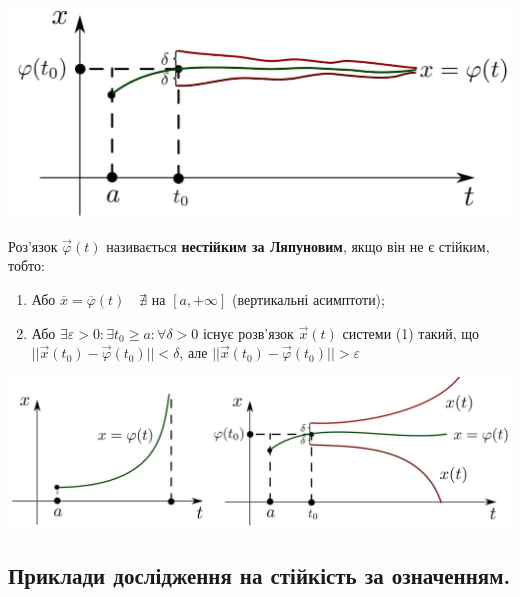 \documentclass[14pt,a4paper]{scrartcl}
\theoremstyle{definition}
\theoremstyle{definition}
\theoremstyle{definition}
\begin{document}
\begin{center} \includegraphics[scale=0.35]{assets/lect2.jpg} \end{center}

Роз'язок $\vec{\varphi}(t)$ називається \textbf{нестійким за Ляпуновим}, якщо він не є стійким, тобто:
\ed

\begin{enumerate}
  \item Або $\overline{x} = \overline{\varphi}(t) \quad \nexists$ на  $[a, +\infty]$ (вертикальні асимптоти);
  \item Або $\exists \varepsilon > 0 : \exists t_0 \geq a :  \forall \delta > 0$ існує розв'язок $\vec{x}(t)$ системи (1) такий, що $||\vec{x}(t_0) - \vec{\varphi}(t_0)|| < \delta$, але $||\vec{x}(t_0) - \vec{\varphi}(t_0)|| > \varepsilon$
\end{enumerate}

\begin{center} \includegraphics[scale=1.25]{assets/lect3+4.jpg} \end{center}

\subsection{Приклади дослідження на стійкість за означенням.}
\end{document}
